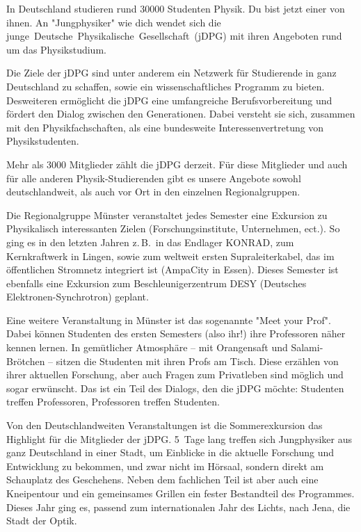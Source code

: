 \begin{multicols}{2}
In Deutschland studieren rund \num{30000} Studenten Physik. Du bist jetzt einer von ihnen. An "Jungphysiker" wie dich wendet sich die junge~Deutsche~Physikalische~Gesellschaft~(jDPG) mit ihren Angeboten rund um das Physikstudium.

Die Ziele der jDPG sind unter anderem ein Netzwerk für Studierende in ganz Deutschland zu schaffen, sowie ein wissenschaftliches Programm zu bieten. Desweiteren ermöglicht die jDPG eine umfangreiche Berufsvorbereitung und fördert den Dialog zwischen den Generationen. Dabei versteht sie sich, zusammen mit den Physikfachschaften, als eine bundesweite Interessenvertretung von Physikstudenten.

Mehr als \num{3000} Mitglieder zählt die jDPG derzeit. Für diese Mitglieder und auch für alle anderen Physik-Studierenden gibt es unsere Angebote sowohl deutschlandweit, als auch vor Ort in den einzelnen Regionalgruppen.

Die Regionalgruppe Münster veranstaltet jedes Semester eine Exkursion zu Physikalisch interessanten Zielen (Forschungsinstitute, Unternehmen, ect.). So ging es in den letzten Jahren z.\,B.\ in das Endlager KONRAD, zum Kernkraftwerk in Lingen, sowie zum weltweit ersten Supraleiterkabel, das im öffentlichen Stromnetz integriert ist (AmpaCity in Essen). Dieses Semester ist ebenfalls eine Exkursion zum Beschleunigerzentrum DESY (Deutsches Elektronen-Synchrotron) geplant.

Eine weitere Veranstaltung in Münster ist das sogenannte "Meet your Prof". Dabei können Studenten des ersten Semesters (also ihr!) ihre Professoren näher kennen lernen. In gemütlicher Atmosphäre -- mit Orangensaft und Salami-Brötchen -- sitzen die Studenten mit ihren Profs am Tisch. Diese erzählen von ihrer aktuellen Forschung, aber auch Fragen zum Privatleben sind möglich und sogar erwünscht. Das ist ein Teil des Dialogs, den die jDPG möchte: Studenten treffen Professoren, Professoren treffen Studenten.

Von den Deutschlandweiten Veranstaltungen ist die Sommerexkursion das Highlight für die Mitglieder der jDPG. 5~Tage lang treffen sich Jungphysiker aus ganz Deutschland in einer Stadt, um Einblicke in die aktuelle Forschung und Entwicklung zu bekommen, und zwar nicht im Hörsaal, sondern direkt am Schauplatz des Geschehens. Neben dem fachlichen Teil ist aber auch eine Kneipentour und ein gemeinsames Grillen ein fester Bestandteil des Programmes.\\
Dieses Jahr ging es, passend zum internationalen Jahr des Lichts, nach Jena, die Stadt der Optik.


\end{multicols}
